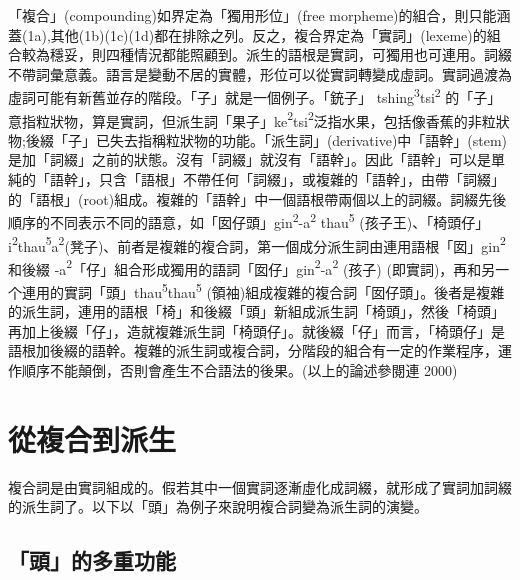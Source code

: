 \textrm{「複合」(compounding)如界定為「獨用形位」(free morpheme)的組合，則只能涵蓋(1a),其他(1b)(1c)(1d)都在排除之列。反之，複合界定為「實詞」(lexeme)的組合較為穩妥，則四種情況都能照顧到。派生的語根是實詞，可獨用也可連用。詞綴不帶詞彙意義。語言是變動不居的實體，形位可以從實詞轉變成虛詞。實詞過渡為虛詞可能有新舊並存的階段。「子」就是一個例子。「銃子」 tshing}\textrm{\textsuperscript{3}}\textrm{tsi}\textrm{\textsuperscript{2} }\textrm{的「子」意指粒狀物，算是實詞，但派生詞「果子」ke}\textrm{\textsuperscript{2}}\textrm{tsi}\textrm{\textsuperscript{2}}\textrm{泛指水果，包括像香蕉的非粒狀物;後綴「子」已失去指稱粒狀物的功能。「派生詞」(derivative)中「語幹」(stem)是加「詞綴」之前的狀態。沒有「詞綴」就沒有「語幹」。因此「語幹」可以是單純的「語幹」，只含「語根」不帶任何「詞綴」，或複雜的「語幹」，由帶「詞綴」的「語根」(root)組成。複雜的「語幹」中一個語根帶兩個以上的詞綴。詞綴先後順序的不同表示不同的語意，如「囡仔頭」gin}\textrm{\textsuperscript{2}}\textrm{{}-a}\textrm{\textsuperscript{2}} \textrm{thau}\textrm{\textsuperscript{5}} \textrm{(孩子王)}、\textrm{「椅頭仔」i}\textrm{\textsuperscript{2}}\textrm{thau}\textrm{\textsuperscript{5}}\textrm{a}\textrm{\textsuperscript{2}}\textrm{(凳子)}、\textrm{前者是複雜的複合詞，第一個成分派生詞由連用語根「囡」gin}\textrm{\textsuperscript{2}}\textrm{和後綴 {}-a}\textrm{\textsuperscript{2}}\textrm{「仔」組合形成獨用的語詞「囡仔」gin}\textrm{\textsuperscript{2}}\textrm{{}-a}\textrm{\textsuperscript{2}} \textrm{(孩子) (即實詞)}，\textrm{再和另一个連用的實詞「頭」thau}\textrm{\textsuperscript{5}}\textrm{thau}\textrm{\textsuperscript{5} }\textrm{(領袖)組成複雜的複合詞「囡仔頭」。後者是複雜的派生詞，連用的語根「椅」和後綴「頭」新組成派生詞「椅頭」，然後「椅頭」再加上後綴「仔」，造就複雜派生詞「椅頭仔」。就後綴「仔」而言，「椅頭仔」是語根加後綴的語幹。複雜的派生詞或複合詞，分階段的組合有一定的作業程序，運作順序不能顛倒，否則會產生不合語法的後果。(以上的論述參閱連 2000)}

\section{\rmfamily 從複合到派生}

\textrm{複合詞是由實詞組成的。假若其中一個實詞逐漸虛化成詞綴，就形成了實詞加詞綴的派生詞了。以下以「頭」為例子來說明複合詞變為派生詞的演變。}

\subsection{\rmfamily 「頭」的多重功能}

